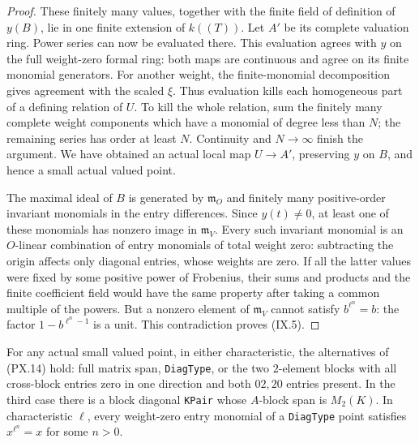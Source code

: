 \begin{proof}
These finitely many values, together with the finite field
of definition of $y(B)$, lie in one finite extension of
$k((T))$.  Let $A'$ be its complete valuation ring.
Power series can now be evaluated there.  This evaluation
agrees with $y$ on the full weight-zero formal ring: both
maps are continuous and agree on its finite monomial
generators.  For another weight, the finite-monomial
decomposition gives agreement with the scaled $\xi$.
Thus evaluation kills each homogeneous part of a defining
relation of $U$.  To kill the whole relation, sum the
finitely many complete weight components which have a
monomial of degree less than $N$; the remaining series has
order at least $N$.  Continuity and $N\to\infty$ finish the
argument.  We have obtained an actual local map $U\to A'$,
preserving $y$ on $B$, and hence a small actual valued point.

The maximal ideal of $B$ is generated by
$\mathfrak m_O$ and finitely many positive-order invariant
monomials in the entry differences.  Since $y(t)\ne0$,
at least one of these monomials has nonzero image in
$\mathfrak m_V$.  Every such invariant monomial is an
$O$-linear combination of entry monomials of total weight
zero: subtracting the origin affects only diagonal entries,
whose weights are zero.  If all the latter values were
fixed by some positive power of Frobenius, their sums and
products and the finite coefficient field would have the
same property after taking a common multiple of the powers.
But a nonzero element of $\mathfrak m_V$ cannot satisfy
$b^{\ell^n}=b$: the factor $1-b^{\ell^n-1}$ is a unit.
This contradiction proves (IX.5).
\end{proof}

\begin{proposition}
\label{claim:IX4}
For any actual small valued point, in either characteristic,
the alternatives of (PX.14) hold: full matrix span,
\texttt{DiagType}, or the two $2$-element blocks with all
cross-block entries zero in one direction and both $02,20$
entries present.  In the third case there is a block diagonal
\texttt{KPair} whose $A$-block span is $M_2(K)$.
In characteristic $\ell$, every weight-zero entry monomial
of a \texttt{DiagType} point satisfies
$x^{\ell^n}=x$ for some $n>0$.
\end{proposition}

